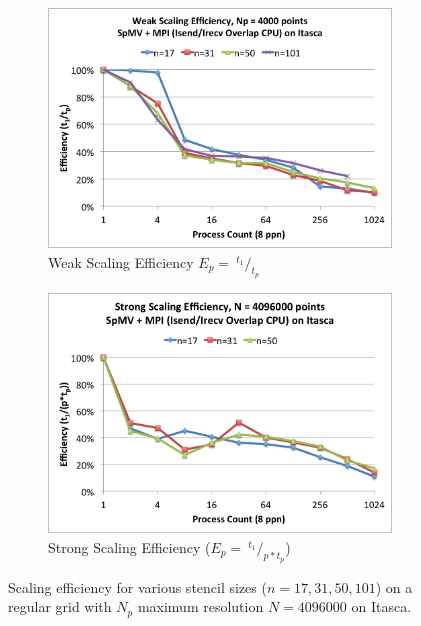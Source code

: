 \documentclass{report}
\begin{document}
\begin{figure}
\centering
\begin{subfigure}{0.48\textwidth}
\centering
\includegraphics[width=\textwidth]{performance_content/scaling/weak_scaling_efficiency_np4000_overlap_cpu_SpMV_and_comm_all_stencils.png}
\caption{Weak Scaling Efficiency $E_p = \ ^{t_1}/_{t_p}$}
\label{fig:compare_weak_scaling_efficiency_all_stencils}
\end{subfigure}
\begin{subfigure}{0.48\textwidth}
\centering
\includegraphics[width=\textwidth]{performance_content/scaling/strong_scaling_efficiency_4M_overlap_cpu_SpMV_and_comm_all_stencils.png}
\caption{Strong Scaling Efficiency ($E_p = \ ^{t_{1}}/_{p*t_p} $)}
\label{fig:compare_strong_scaling_efficiency_all_stencils}
\end{subfigure}
\caption{Scaling efficiency for various stencil sizes ($n=17, 31, 50, 101$) on a regular grid with $N_p$ maximum resolution $N=4096000$ on Itasca. } 
\label{fig:scaling_efficiency}
\end{figure}
\end{document}

